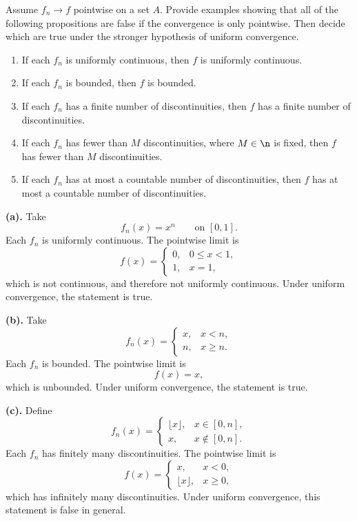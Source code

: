 \begin{problem}[Exercise 6.2.6]{
    Assume $f_n\to f$ pointwise on a set $A$.
    Provide examples showing that all of the following propositions are false if the convergence is only pointwise.
    Then decide which are true under the stronger hypothesis of uniform convergence.
    \begin{enumerate}[label={(\alph*)}]
	\item If each $f_n$ is uniformly continuous, then $f$ is uniformly continuous.
    \item If each $f_n$ is bounded, then $f$ is bounded.
    \item If each $f_n$ has a finite number of discontinuities, then $f$ has a finite number of discontinuities.
    \item If each $f_n$ has fewer than $M$ discontinuities, where $M\in\n$ is fixed, then $f$ has fewer than $M$ discontinuities.
    \item If each $f_n$ has at most a countable number of discontinuities, then $f$ has at most a countable number of discontinuities.
    \end{enumerate}
}
    \textbf{(a).}
    Take
    \[
        f_n(x)=x^n
        \qquad\text{on }[0,1].
    \]
    Each $f_n$ is uniformly continuous.
    The pointwise limit is
    \[
        f(x)=
        \begin{cases}
            0,&0\leq x<1,\\
            1,&x=1,
        \end{cases}
    \]
    which is not continuous, and therefore not uniformly continuous.
    Under uniform convergence, the statement is true.

    \textbf{(b).}
    Take
    \[
        f_n(x)=
        \begin{cases}
            x,&x<n,\\
            n,&x\geq n.
        \end{cases}
    \]
    Each $f_n$ is bounded.
    The pointwise limit is
    \[
        f(x)=x,
    \]
    which is unbounded.
    Under uniform convergence, the statement is true.

    \textbf{(c).}
    Define
    \[
        f_n(x)=
        \begin{cases}
            \lfloor x\rfloor,&x\in[0,n],\\
            x,&x\notin[0,n].
        \end{cases}
    \]
    Each $f_n$ has finitely many discontinuities.
    The pointwise limit is
    \[
        f(x)=
        \begin{cases}
            x,&x<0,\\
            \lfloor x\rfloor,&x\geq 0,
        \end{cases}
    \]
    which has infinitely many discontinuities.
    Under uniform convergence, this statement is false in general.


\end{problem}
